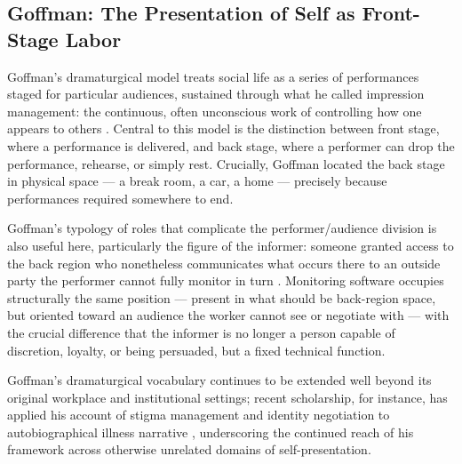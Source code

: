 \documentclass[10pt]{article}
\begin{document}
\subsection{Goffman: The Presentation of Self as Front-Stage Labor}

Goffman's dramaturgical model treats social life as a series of performances staged for particular audiences, sustained through what he called impression management: the continuous, often unconscious work of controlling how one appears to others \cite{goffman}. Central to this model is the distinction between front stage, where a performance is delivered, and back stage, where a performer can drop the performance, rehearse, or simply rest. Crucially, Goffman located the back stage in physical space --- a break room, a car, a home --- precisely because performances required somewhere to end.

Goffman's typology of roles that complicate the performer/audience division is also useful here, particularly the figure of the informer: someone granted access to the back region who nonetheless communicates what occurs there to an outside party the performer cannot fully monitor in turn \cite{goffman}. Monitoring software occupies structurally the same position --- present in what should be back-region space, but oriented toward an audience the worker cannot see or negotiate with --- with the crucial difference that the informer is no longer a person capable of discretion, loyalty, or being persuaded, but a fixed technical function.

Goffman's dramaturgical vocabulary continues to be extended well beyond its original workplace and institutional settings; recent scholarship, for instance, has applied his account of stigma management and identity negotiation to autobiographical illness narrative \cite{almansoori}, underscoring the continued reach of his framework across otherwise unrelated domains of self-presentation.
\end{document}
